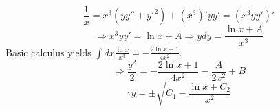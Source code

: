 \item

\[
	\frac{1}{x}
	= x^3 \left( yy'' + y'^2 \right) + (x^3)' yy'
	= \left( x^3 yy' \right)'
\]
\[
	\Rightarrow x^3 yy' = \ln x + A
	\Rightarrow ydy = \frac{\ln x + A}{x^3}
\]
Basic calculus yields $\int dx \frac{\ln x}{x^3} = -\frac{2\ln x + 1}{4x^2}$.
\[
	\Rightarrow \frac{y^2}{2} = -\frac{2\ln x + 1}{4x^2} - \frac{A}{2x^2} + B
\]
\[
	\therefore y = \pm \sqrt{C_1 - \frac{\ln x + C_2}{x^2}}
\]